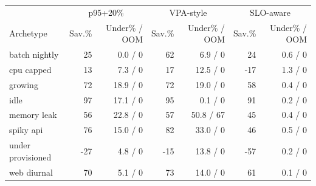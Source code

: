\begin{tabular}{lrrrrrr}\toprule
 & \multicolumn{2}{c}{p95+20\%} & \multicolumn{2}{c}{VPA-style} & \multicolumn{2}{c}{SLO-aware} \\
Archetype & Sav.\% & Under\% / OOM & Sav.\% & Under\% / OOM & Sav.\% & Under\% / OOM \\\midrule
batch nightly & 25 & 0.0 / 0 & 62 & 6.9 / 0 & 24 & 0.6 / 0 \\
cpu capped & 13 & 7.3 / 0 & 17 & 12.5 / 0 & -17 & 1.3 / 0 \\
growing & 72 & 18.9 / 0 & 72 & 19.0 / 0 & 58 & 0.4 / 0 \\
idle & 97 & 17.1 / 0 & 95 & 0.1 / 0 & 91 & 0.2 / 0 \\
memory leak & 56 & 22.8 / 0 & 57 & 50.8 / 67 & 45 & 0.4 / 0 \\
spiky api & 76 & 15.0 / 0 & 82 & 33.0 / 0 & 46 & 0.5 / 0 \\
under provisioned & -27 & 4.8 / 0 & -15 & 13.8 / 0 & -57 & 0.2 / 0 \\
web diurnal & 70 & 5.1 / 0 & 73 & 14.0 / 0 & 61 & 0.1 / 0 \\
\bottomrule\end{tabular}

